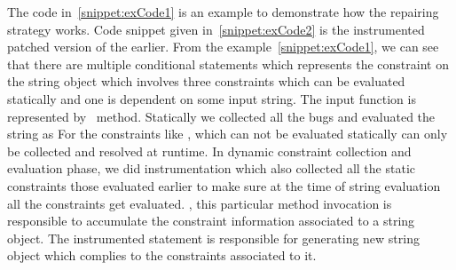 The code in~\ref{snippet:exCode1} is an example to demonstrate how the repairing strategy
works. Code snippet given in~\ref{snippet:exCode2} is the instrumented patched version of
the earlier. From the example~\ref{snippet:exCode1}, we can see that there are multiple 
conditional statements which represents the constraint on the string object  which
involves three constraints which can be evaluated statically and one is dependent on some
input string. The input function is represented by~ method. Statically we
collected all the bugs and evaluated the string as  
For the constraints like , which can not be evaluated statically
can only be collected and resolved at runtime. In dynamic constraint collection and evaluation 
phase, we did instrumentation which also collected all the static constraints those evaluated
earlier to make sure at the time of string evaluation all the constraints get evaluated.
, this particular
method invocation is responsible to accumulate the constraint information associated
to a string object. The instrumented statement 
is responsible for generating new string object which complies to the constraints 
associated to it.




